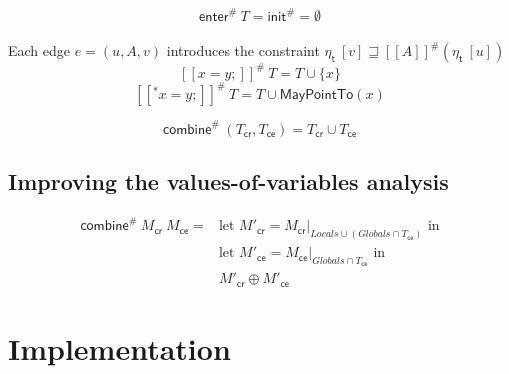       \[\textsf{enter}^{\#}\ T = \textsf{init}^{\#} = \emptyset\]
      \\
      Each edge $e = (u, A, v)$ introduces the constraint $\eta_\textsf{t}\ [v] \sqsupseteq [\![  A ]\!]^{\#}  (\eta_\textsf{t}\ [u]) $\\
      \[ [\![ x = y; ]\!] ^{\#}\ T =  T \cup \{x\} \]
      \[ [\![ ^*x = y; ]\!] ^{\#}\ T =  T \cup \textsf{MayPointTo}(x) \]

      \[ \textsf{combine}^{\#}\ (T_\textsf{cr}, T_\textsf{ce}) = T_\textsf{cr} \cup T_\textsf{ce} \]

    \subsection{Improving the values-of-variables analysis}
      \begin{align*}
        \textsf{combine}^{\#}\ M_\textsf{cr}\ M_\textsf{ce} = & \text{let } M'_\textsf{cr} = M_\textsf{cr}|_{Locals \cup (Globals \cap T_\textsf{ce})} \text{ in}\\
        & \text{let } M'_\textsf{ce} = M_\textsf{ce}|_{Globals \cap T_\textsf{ce}}\text{ in} \\
        & M'_\textsf{cr} \oplus M'_\textsf{ce}
      \end{align*}

  \section{Implementation}


